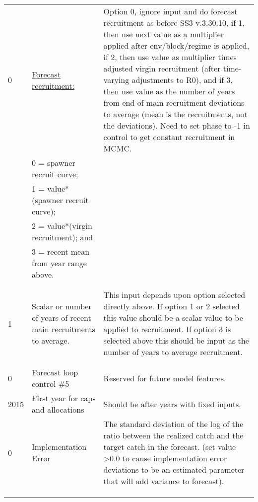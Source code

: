 \begin{landscape}
{\begin{longtable}{p{3.2cm} p{7cm} p{10.8cm}}
 0 \Tstrut & \hyperlink{ForeSpawn}{Forecast recruitment:} & \multirow{1}{1cm}[-0.25cm]{\parbox{11cm}{Option 0, ignore input and do forecast recruitment as before SS3 v.3.30.10, if 1, then use next value as a multiplier applied after env/block/regime is applied, if 2, then use value as multiplier times adjusted virgin recruitment (after time-varying adjustments to R0), and if 3, then use value as the number of years from end of main recruitment deviations to average (mean is the recruitments, not the deviations). Need to set phase to -1 in control to get constant recruitment in MCMC.}} \\
    & 0 = spawner recruit curve; & \\
    & 1 = value*(spawner recruit curve); & \\
    & 2 = value*(virgin recruitment); and & \\
    & 3 = recent mean from year range above. & \\
    & & \\
    & & \\
     
 \hline
 1 \Tstrut & Scalar or number of years of recent main recruitments to average. & \multirow{1}{1cm}[-0.25cm]{\parbox{11cm}{This input depends upon option selected directly above.  If option 1 or 2 selected this value should be a scalar value to be applied to recruitment. If option 3 is selected above this should be input as the number of years to average recruitment.}} \\
 & & \\
 & & \\
 
 0 & Forecast loop control \#5 & Reserved for future model features. \Bstrut\\
 
 \hline
 2015 \Tstrut & First year for caps and allocations & \multirow{1}{1cm}[-0.10cm]{\parbox{11cm}{Should be after years with fixed inputs.}} \Bstrut\\

 \hline
 0 \Tstrut & Implementation Error & \multirow{1}{1cm}[-0.25cm]{\parbox{11cm}{The standard deviation of the log of the ratio between the realized catch and the target catch in the forecast. (set value >0.0 to cause implementation error deviations to be an estimated parameter that will add variance to forecast).}} \\
   &   & \\
   &   & \\
   &   & \Bstrut\\
 

\end{longtable}}
\end{landscape}
